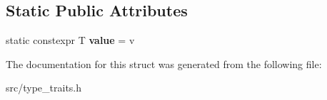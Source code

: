 \subsection*{Static Public Attributes}
\begin{DoxyCompactItemize}
\item 
static constexpr T {\bfseries value} = v\hypertarget{structstd_1_1integral__constant_aeb13450790039d71c68069a97a9fad40}{}\label{structstd_1_1integral__constant_aeb13450790039d71c68069a97a9fad40}

\end{DoxyCompactItemize}


The documentation for this struct was generated from the following file\+:\begin{DoxyCompactItemize}
\item 
src/type\+\_\+traits.\+h\end{DoxyCompactItemize}
